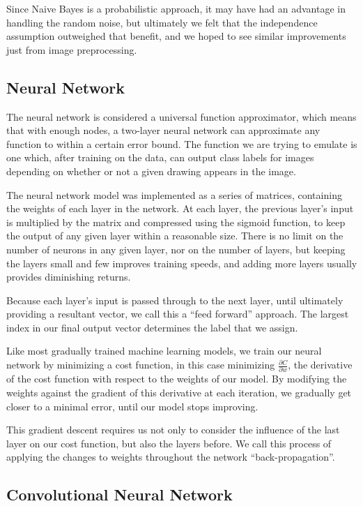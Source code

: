 \documentclass[conference]{IEEEtran}
\begin{document}
Since Naive Bayes is a probabilistic approach, it may have had an advantage in handling the random noise, but ultimately we felt that the independence assumption outweighed that benefit, and we hoped to see similar improvements just from image preprocessing.

\subsection{Neural Network}

The neural network is considered a universal function approximator, which means that with enough nodes, a two-layer neural network can approximate any function to within a certain error bound. The function we are trying to emulate is one which, after training on the data, can output class labels for images depending on whether or not a given drawing appears in the image.

The neural network model was implemented as a series of matrices, containing the weights of each layer in the network. At each layer, the previous layer's input is multiplied by the matrix and compressed using the sigmoid function, to keep the output of any given layer within a reasonable size. There is no limit on the number of neurons in any given layer, nor on the number of layers, but keeping the layers small and few improves training speeds, and adding more layers usually provides diminishing returns.

Because each layer's input is passed through to the next layer, until ultimately providing a resultant vector, we call this a ``feed forward'' approach. The largest index in our final output vector determines the label that we assign.

Like most gradually trained machine learning models, we train our neural network by minimizing a cost function, in this case minimizing $\frac{\partial C}{\partial w}$, the derivative of the cost function with respect to the weights of our model. By modifying the weights against the gradient of this derivative at each iteration, we gradually get closer to a minimal error, until our model stops improving. 

This gradient descent requires us not only to consider the influence of the last layer on our cost function, but also the layers before. We call this process of applying the changes to weights throughout the network ``back-propagation''.

\subsection{Convolutional Neural Network}
\end{document}
